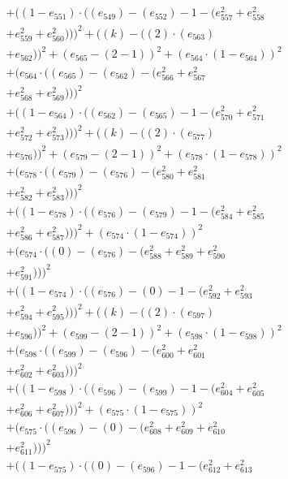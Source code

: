 \documentclass[10pt, a4paper]{article}
\begin{document}
\begin{small}
\begin{align*}
& + ((1 - e_{551})  \cdot  ((e_{549}) - (e_{552}) - 1 - (e_{557}^{2} + e_{558}^{2} \\
& + e_{559}^{2} + e_{560}^{2})))^{2} + ((k) - ((2)  \cdot  (e_{563}) \\
& + e_{562}))^{2} + (e_{565} - (2 - 1))^{2} + (e_{564}  \cdot  (1 - e_{564}))^{2} \\
& + (e_{564}  \cdot  ((e_{565}) - (e_{562}) - (e_{566}^{2} + e_{567}^{2} \\
& + e_{568}^{2} + e_{569}^{2})))^{2} \\
& + ((1 - e_{564})  \cdot  ((e_{562}) - (e_{565}) - 1 - (e_{570}^{2} + e_{571}^{2} \\
& + e_{572}^{2} + e_{573}^{2})))^{2} + ((k) - ((2)  \cdot  (e_{577}) \\
& + e_{576}))^{2} + (e_{579} - (2 - 1))^{2} + (e_{578}  \cdot  (1 - e_{578}))^{2} \\
& + (e_{578}  \cdot  ((e_{579}) - (e_{576}) - (e_{580}^{2} + e_{581}^{2} \\
& + e_{582}^{2} + e_{583}^{2})))^{2} \\
& + ((1 - e_{578})  \cdot  ((e_{576}) - (e_{579}) - 1 - (e_{584}^{2} + e_{585}^{2} \\
& + e_{586}^{2} + e_{587}^{2})))^{2} + (e_{574}  \cdot  (1 - e_{574}))^{2} \\
& + (e_{574}  \cdot  ((0) - (e_{576}) - (e_{588}^{2} + e_{589}^{2} + e_{590}^{2} \\
& + e_{591}^{2})))^{2} \\
& + ((1 - e_{574})  \cdot  ((e_{576}) - (0) - 1 - (e_{592}^{2} + e_{593}^{2} \\
& + e_{594}^{2} + e_{595}^{2})))^{2} + ((k) - ((2)  \cdot  (e_{597}) \\
& + e_{596}))^{2} + (e_{599} - (2 - 1))^{2} + (e_{598}  \cdot  (1 - e_{598}))^{2} \\
& + (e_{598}  \cdot  ((e_{599}) - (e_{596}) - (e_{600}^{2} + e_{601}^{2} \\
& + e_{602}^{2} + e_{603}^{2})))^{2} \\
& + ((1 - e_{598})  \cdot  ((e_{596}) - (e_{599}) - 1 - (e_{604}^{2} + e_{605}^{2} \\
& + e_{606}^{2} + e_{607}^{2})))^{2} + (e_{575}  \cdot  (1 - e_{575}))^{2} \\
& + (e_{575}  \cdot  ((e_{596}) - (0) - (e_{608}^{2} + e_{609}^{2} + e_{610}^{2} \\
& + e_{611}^{2})))^{2} \\
& + ((1 - e_{575})  \cdot  ((0) - (e_{596}) - 1 - (e_{612}^{2} + e_{613}^{2} \\

\end{align*}
\end{small}
\end{document}
